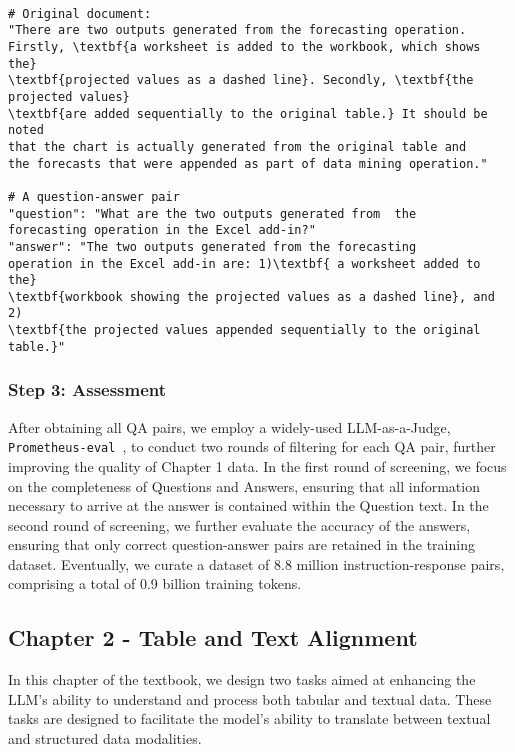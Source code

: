 \begin{tcolorbox}[left=1pt, right=0pt, top=1pt, bottom=1pt]
\begin{Verbatim}

# Original document:
"There are two outputs generated from the forecasting operation. 
Firstly, \textbf{a worksheet is added to the workbook, which shows the} 
\textbf{projected values as a dashed line}. Secondly, \textbf{the projected values} 
\textbf{are added sequentially to the original table.} It should be noted 
that the chart is actually generated from the original table and 
the forecasts that were appended as part of data mining operation."

# A question-answer pair
"question": "What are the two outputs generated from  the 
forecasting operation in the Excel add-in?"
"answer": "The two outputs generated from the forecasting 
operation in the Excel add-in are: 1)\textbf{ a worksheet added to the} 
\textbf{workbook showing the projected values as a dashed line}, and 2) 
\textbf{the projected values appended sequentially to the original table.}"
\end{Verbatim}
\end{tcolorbox}

\subsubsection{Step 3: Assessment}
After obtaining all QA pairs, we employ a widely-used LLM-as-a-Judge, \texttt{Prometheus-eval}~\citep{kim2024prometheus}, to conduct two rounds of filtering for each QA pair, further improving the quality of Chapter 1 data. In the first round of screening, we focus on the completeness of Questions and Answers, ensuring that all information necessary to arrive at the answer is contained within the Question text. In the second round of screening, we further evaluate the accuracy of the answers, ensuring that only correct question-answer pairs are retained in the training dataset. Eventually, we curate a dataset of 8.8 million instruction-response pairs, comprising a total of 0.9 billion training tokens.


\subsection{Chapter 2 - Table and Text Alignment}
\label{sec:chapter2}
In this chapter of the textbook, we design two tasks aimed at enhancing the LLM's ability to understand and process both tabular and textual data. These tasks are designed to facilitate the model's ability to translate between textual and structured data modalities.

